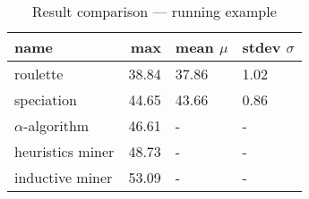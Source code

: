 \begin{table}
\centering
\caption{Result comparison --- running example}
\begin{tabular}{lrll}
\toprule
             name &   max & mean $\mu$ & stdev $\sigma$ \\
\midrule
         roulette & 38.84 &     37.86 &          1.02 \\
       speciation & 44.65 &     43.66 &          0.86 \\
$\alpha$-algorithm & 46.61 &         - &             - \\
 heuristics miner & 48.73 &         - &             - \\
  inductive miner & 53.09 &         - &             - \\
\bottomrule
\end{tabular}
\end{table}
